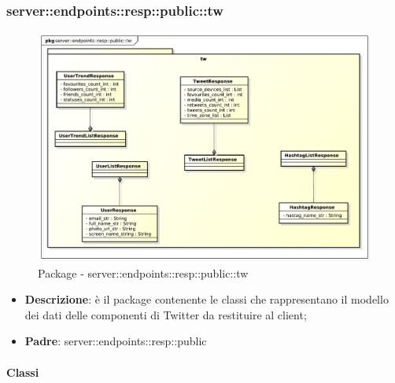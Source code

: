 \subsubsection{server::endpoints::resp::public::tw} %
\label{ssub:bdsm_app_server_endpoints_resp_public_tw}
\begin{figure}[!htbp]
	\centering
	\centerline{\includegraphics[scale=0.5]{./images/server/resp_tw.pdf}}
	\caption{Package - server::endpoints::resp::public::tw}
\end{figure}

\begin{itemize}
  \item \textbf{Descrizione}: è il package contenente le classi che rappresentano il modello dei dati delle componenti di Twitter da restituire al client;
  \item \textbf{Padre}: server::endpoints::resp::public
\end{itemize}

	\paragraph{Classi} %


